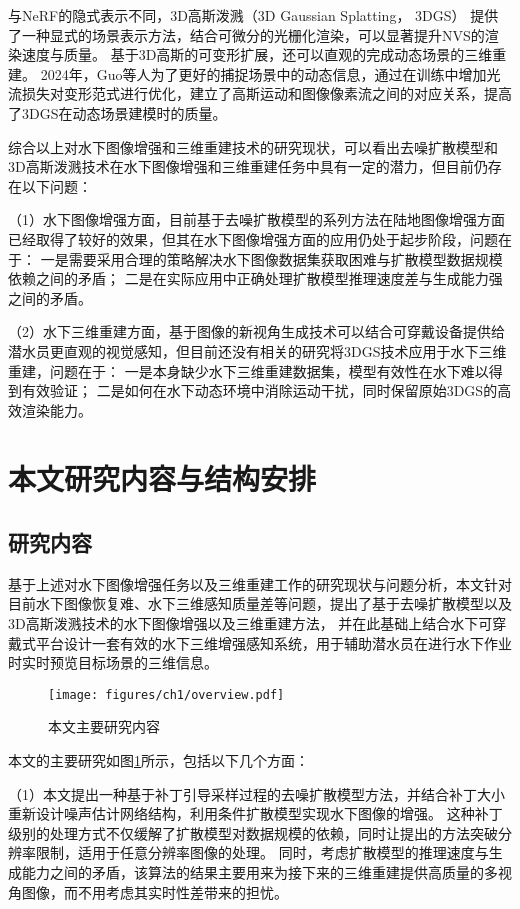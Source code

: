 与NeRF的隐式表示不同，3D高斯泼溅（3D Gaussian Splatting， 3DGS） \cite{3DGS} 提供了一种显式的场景表示方法，结合可微分的光栅化渲染，可以显著提升NVS的渲染速度与质量。
基于3D高斯的可变形扩展\cite{dynamic_3DGS1}\cite{dynamic_3DGS2}\cite{dynamic_3DGS_efficient}\cite{4DGS}，还可以直观的完成动态场景的三维重建。
2024年，Guo等人\cite{flow_2024motion}为了更好的捕捉场景中的动态信息，通过在训练中增加光流损失对变形范式进行优化，建立了高斯运动和图像像素流之间的对应关系，提高了3DGS在动态场景建模时的质量。

综合以上对水下图像增强和三维重建技术的研究现状，可以看出去噪扩散模型和3D高斯泼溅技术在水下图像增强和三维重建任务中具有一定的潜力，但目前仍存在以下问题：

（1）水下图像增强方面，目前基于去噪扩散模型的系列方法在陆地图像增强方面已经取得了较好的效果，但其在水下图像增强方面的应用仍处于起步阶段，问题在于：
一是需要采用合理的策略解决水下图像数据集获取困难与扩散模型数据规模依赖之间的矛盾；
二是在实际应用中正确处理扩散模型推理速度差与生成能力强之间的矛盾。

（2）水下三维重建方面，基于图像的新视角生成技术可以结合可穿戴设备提供给潜水员更直观的视觉感知，但目前还没有相关的研究将3DGS技术应用于水下三维重建，问题在于：
一是本身缺少水下三维重建数据集，模型有效性在水下难以得到有效验证；
二是如何在水下动态环境中消除运动干扰，同时保留原始3DGS的高效渲染能力。


\section{本文研究内容与结构安排}
\subsection{研究内容}
基于上述对水下图像增强任务以及三维重建工作的研究现状与问题分析，本文针对目前水下图像恢复难、水下三维感知质量差等问题，提出了基于去噪扩散模型以及3D高斯泼溅技术的水下图像增强以及三维重建方法\cite{patch_based_ddpm}，
并在此基础上结合水下可穿戴式平台设计一套有效的水下三维增强感知系统，用于辅助潜水员在进行水下作业时实时预览目标场景的三维信息。
\begin{figure}
    \centering
    \texttt{[image: figures/ch1/overview.pdf]}
    \caption{本文主要研究内容}
    \label{img:overview}
\end{figure}

本文的主要研究如图\ref{img:overview}所示，包括以下几个方面：

（1）本文提出一种基于补丁引导采样过程的去噪扩散模型方法，并结合补丁大小重新设计噪声估计网络结构，利用条件扩散模型实现水下图像的增强。
这种补丁级别的处理方式不仅缓解了扩散模型对数据规模的依赖，同时让提出的方法突破分辨率限制，适用于任意分辨率图像的处理。
同时，考虑扩散模型的推理速度与生成能力之间的矛盾，该算法的结果主要用来为接下来的三维重建提供高质量的多视角图像，而不用考虑其实时性差带来的担忧。\cite{patch_based_ddpm}

